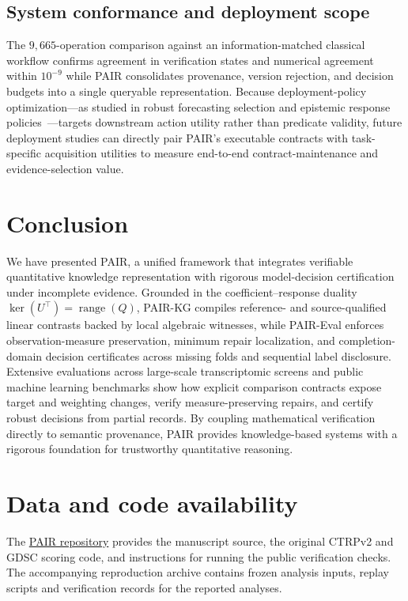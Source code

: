 \documentclass[preprint,12pt,number,sort&compress]{elsarticle}
\newcommand{\method}{PAIR\xspace}
\newcommand{\pairkg}{PAIR-KG\xspace}
\newcommand{\paireval}{PAIR-Eval\xspace}
\begin{document}
\subsection{System conformance and deployment scope}
The $9{,}665$-operation comparison against an information-matched classical workflow confirms agreement in verification states and numerical agreement within $10^{-9}$ while \method consolidates provenance, version rejection, and decision budgets into a single queryable representation. Because deployment-policy optimization---as studied in robust forecasting selection and epistemic response policies~\cite{semper2026robust,kinalioglu2026eprag}---targets downstream action utility rather than predicate validity, future deployment studies can directly pair \method's executable contracts with task-specific acquisition utilities to measure end-to-end contract-maintenance and evidence-selection value.

\section{Conclusion}\label{sec:conclusion}
We have presented \method, a unified framework that integrates verifiable quantitative knowledge representation with rigorous model-decision certification under incomplete evidence. Grounded in the coefficient--response duality $\ker(U^\top)=\operatorname{range}(Q)$, \pairkg compiles reference- and source-qualified linear contrasts backed by local algebraic witnesses, while \paireval enforces observation-measure preservation, minimum repair localization, and completion-domain decision certificates across missing folds and sequential label disclosure. Extensive evaluations across large-scale transcriptomic screens and public machine learning benchmarks show how explicit comparison contracts expose target and weighting changes, verify measure-preserving repairs, and certify robust decisions from partial records. By coupling mathematical verification directly to semantic provenance, \method provides knowledge-based systems with a rigorous foundation for trustworthy quantitative reasoning.

\section*{Data and code availability}
The \href{https://github.com/zhurunze44-hash/PAIR-IS-R9-reproducibility}{PAIR repository} provides the manuscript source, the original CTRPv2 and GDSC scoring code, and instructions for running the public verification checks. The accompanying reproduction archive contains frozen analysis inputs, replay scripts and verification records for the reported analyses.
\end{document}
